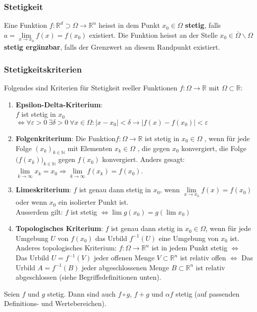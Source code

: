 \documentclass[a4paper,10pt]{scrartcl}
\begin{document}
\subsubsection{Stetigkeit}
Eine Funktion $f:\mathbb{R}^d \supset \Omega \to \mathbb{R}^n$ heisst in dem Punkt $x_0\in\Omega$ \textbf{stetig}, falls $a=\lim\limits_{x\to x_0} f(x) = f(x_0)$ existiert. Die Funktion heisst an der Stelle $x_0\in\overline{\Omega}\backslash \Omega$ \textbf{stetig ergänzbar}, falls der Grenzwert an diesem Randpunkt existiert. 
\subsubsection{Stetigkeitskriterien}
Folgendes sind Kriterien für Stetigkeit reeller Funktionen $f:\Omega\to\mathbb{R}$ mit $\Omega\subset \mathbb{R}$:
\begin{enumerate}[label=$\circ$]
	\item \textbf{Epsilon-Delta-Kriterium}:\\
	$f$ ist stetig in $x_0$ $\Leftrightarrow \forall \varepsilon>0 \ \exists \delta > 0 \ \forall x \in \Omega: |x-x_0|<\delta \rightarrow	|f(x)-f(x_0)|<\varepsilon$ 
	\item \textbf{Folgenkriterium}: 
	Die Funktion$f\colon \Omega\to \mathbb {R} $  ist stetig in $x_0 \in \Omega$ , wenn für jede Folge $ (x_{k})_{k\in \mathbb {N} }$  mit Elementen $x_{k}\in \Omega$ , die gegen $x_0$  konvergiert, die Folge ${\bigl (}f(x_{k}){\bigr )}_{k\in \mathbb {N} }$  gegen $f(x_0 )$ konvergiert. Anders gesagt: $\lim\limits_{k\to \infty} x_k=x_0 \Rightarrow \lim\limits_{k\to \infty} f(x_k)=f(x_0)$.
	\item \textbf{Limeskriterium}: $f$ ist genau dann stetig in $x_0$, wenn $\lim\limits_{x\to x_0} f(x) = f(x_0)$ oder wenn $x_0$ ein isolierter Punkt ist.\\
	Ausserdem gilt: $f$ ist stetig $\Leftrightarrow \lim g(x_0) = g(\lim x_0)$ 
	\item \textbf{Topologisches Kriterium}: $f$ ist genau dann stetig in $x_0\in \Omega$, wenn für jede Umgebung $U$ von $f(x_0)$ das Urbild $f^{-1}(U)$ eine Umgebung von $x_0$ ist.\\
	Anderes topologisches Kriterium: $f:\Omega\to \mathbb{R}^n$ ist in jedem Punkt stetig  $\Leftrightarrow$ Das Urbild $U=f^{-1}(V)$ jeder offenen Menge $V\subset \mathbb{R}^n$ ist relativ offen $\Leftrightarrow$ Das Urbild $A=f^{-1}(B)$ jeder abgeschlossenen Menge $B \subset \mathbb{R}^n$ ist relativ abgeschlossen (siehe Begriffsdefinitionen unten).
\end{enumerate}
Seien $f$ und $g$ stetig. Dann sind auch $f\circ g$, $f+g$ und $\alpha f$ stetig (auf passenden Definitions- und Wertebereichen). \\
\end{document}
